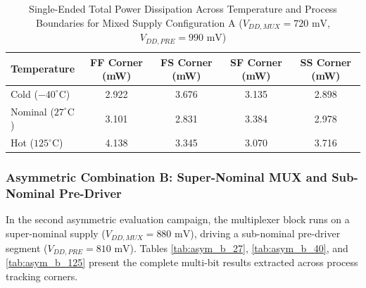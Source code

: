 \begin{table}[H]
    \centering
    \renewcommand{\arraystretch}{1.3}
    \setlength{\tabcolsep}{10pt}
    \small
    \begin{tabular}{|l|c|c|c|c|}
        \hline
        \textbf{Temperature} & \textbf{FF Corner (mW)} & \textbf{FS Corner (mW)} & \textbf{SF Corner (mW)} & \textbf{SS Corner (mW)} \\ \hline
        Cold ($-40^\circ\text{C}$) & 2.922 & 3.676 & 3.135 & 2.898 \\ \hline
        Nominal ($27^\circ\text{C}$) & 3.101 & 2.831 & 3.384 & 2.978 \\ \hline
        Hot ($125^\circ\text{C}$) & 4.138 & 3.345 & 3.070 & 3.716 \\ \hline
    \end{tabular}
    \vspace{2mm}
    \caption{Single-Ended Total Power Dissipation Across Temperature and Process Boundaries for Mixed Supply Configuration A ($V_{DD,MUX} = 720\text{ mV}$, $V_{DD,PRE} = 990\text{ mV}$)}
    \label{tab:asym_a_power_summary}
\end{table}

\clearpage

\subsubsection*{Asymmetric Combination B: Super-Nominal MUX and Sub-Nominal Pre-Driver}

In the second asymmetric evaluation campaign, the multiplexer block runs on a super-nominal supply ($V_{DD,MUX} = 880\text{ mV}$), driving a sub-nominal pre-driver segment ($V_{DD,PRE} = 810\text{ mV}$). Tables \ref{tab:asym_b_27}, \ref{tab:asym_b_40}, and \ref{tab:asym_b_125} present the complete multi-bit results extracted across process tracking corners.

